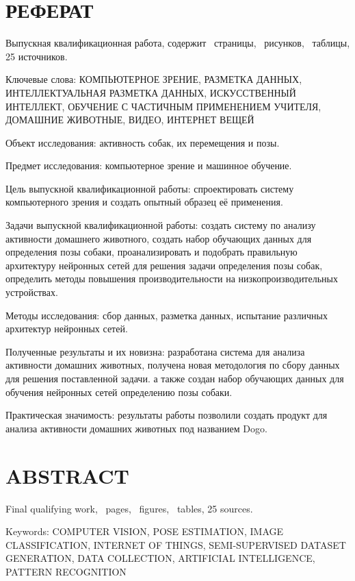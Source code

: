 \chapter*{\textbf{РЕФЕРАТ}}

Выпускная квалификационная работа, содержит \totalpages\ страницы, \totalfigures\  рисунков, \totaltables\  таблицы, 25 источников.

\noindent Ключевые слова: \MakeUppercase{Компьютерное зрение, Разметка данных, Интеллектуальная разметка данных, Искусственный интеллект, Обучение с частичным применением учителя, Домашние животные, Видео, Интернет вещей}

Объект исследования: активность собак, их перемещения и позы.

Предмет исследования: компьютерное зрение и машинное обучение.

Цель выпускной квалификационной работы: спроектировать систему компьютерного зрения и создать опытный образец её применения.

Задачи выпускной квалификационной работы: создать систему по анализу активности домашнего животного, создать набор обучающих данных для определения позы собаки, проанализировать и подобрать правильную архитектуру нейронных сетей для решения задачи определения позы собак, определить методы повышения производительности на низкопроизводительных устройствах.

Методы исследования: сбор данных, разметка данных, испытание различных архитектур нейронных сетей.

Полученные результаты и их новизна: разработана система для анализа активности домашних животных, получена новая методология по сбору данных для решения поставленной задачи. а также создан набор обучающих данных для обучения нейронных сетей определению позы собаки. 

Практическая значимость: результаты работы позволили создать продукт для анализа активности домашних животных под названием Dogo.


\chapter*{ABSTRACT}

Final qualifying work, \totalpages\ pages, \totalfigures\ figures, \totaltables\ tables,
25 sources.

\noindent Keywords: \MakeUppercase{Computer vision, Pose Estimation, Image Classification, Internet of things, Semi-supervised dataset generation, Data Collection, Artificial Intelligence, Pattern Recognition}

